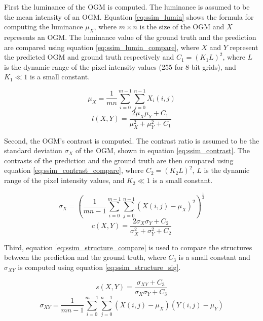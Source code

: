 First the luminance of the \gls{OGM} is computed. The luminance is assumed to be the mean intensity of an \gls{OGM}. Equation \ref{eq:ssim_lumin} shows the formula for computing the luminance $\mu_X$, where $m \times n$ is the size of the \gls{OGM} and $X$ represents an \gls{OGM}. The luminance value of the ground truth and the prediction are compared using equation \ref{eq:ssim_lumin_compare}, where $X$ and $Y$ represent the predicted \gls{OGM} and ground truth respectively and $C_1 = (K_1 L)^2$, where $L$ is the dynamic range of the pixel intensity values (255 for 8-bit grids), and $K_1 \ll 1$ is a small constant.

\begin{equation} \label{eq:ssim_lumin}
	\mu_X = \frac{1}{mn}\sum_{i=0}^{m-1}\sum_{j=0}^{n-1}X_i(i,j)
\end{equation}
\begin{equation} \label{eq:ssim_lumin_compare}
	l(X,Y) = \frac{2\mu_X \mu_Y + C_1}{\mu_X ^2 + \mu_Y ^2 + C_1}
\end{equation}

Second, the \gls{OGM}'s contrast is computed. The contrast ratio is assumed to be the standard deviation $\sigma_X$ of the \gls{OGM}, shown in equation \ref{eq:ssim_contrast}. The contrasts of the prediction and the ground truth are then compared using equation \ref{eq:ssim_contrast_compare}, where $C_2 = (K_2 L)^2$, $L$ is the dynamic range of the pixel intensity values, and $K_2 \ll 1$ is a small constant.

\begin{equation} \label{eq:ssim_contrast}
	\sigma_X = \left(\frac{1}{mn-1}\sum_{i=0}^{m-1}\sum_{j=0}^{n-1}(X(i,j) - \mu_X)^2 \right)^\frac{1}{2}
\end{equation}
\begin{equation} \label{eq:ssim_contrast_compare}
	c(X,Y) = \frac{2\sigma_X \sigma_Y + C_2}{\sigma_X ^2 + \sigma_Y ^2 + C_2}
\end{equation}

Third, equation \ref{eq:ssim_structure_compare} is used to compare the structures between the prediction and the ground truth, where $C_3$ is a small constant and $\sigma_{XY}$ is computed using equation \ref{eq:ssim_structure_sig}.

\begin{equation} \label{eq:ssim_structure_compare}
	s(X,Y) = \frac{\sigma_{XY}+C_3}{\sigma_X\sigma_Y+C_3}
\end{equation}
\begin{equation} \label{eq:ssim_structure_sig}
	\sigma_{XY} = \frac{1}{mn-1}\sum_{i=0}^{m-1}\sum_{j=0}^{n-1}(X(i,j)-\mu_X)(Y(i,j) -\mu_Y)
\end{equation}

